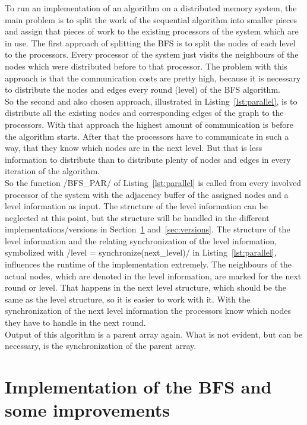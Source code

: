 \documentclass[12pt,a4paper]{article}
\begin{document}
To run an implementation of an algorithm on a distributed memory system, the main problem is to split the work of the sequential algorithm into smaller pieces and assign that pieces of work to the existing processors of the system which are in use.  The first approach of splitting the BFS is to split the nodes of each level to the processors. Every processor of the system just visits the neighbours of the nodes which were distributed before to that processor. The problem with this approach is that the communication costs are pretty high, because it is necessary to distribute the nodes and edges every round (level) of the BFS algorithm.\\
So the second and also chosen approach, illustrated in Listing~\ref{lst:parallel}, is to distribute all the existing nodes and corresponding edges of the graph to the processors. With that approach the highest amount of communication is before the algorithm starts. After that the processors have to communicate in such a way, that they know which nodes are in the next level. But that is less information to distribute than to distribute plenty of nodes and edges in every iteration of the algorithm.\\
So the function \cinline/BFS_PAR/ of Listing~\ref{lst:parallel} is called from every involved processor of the system with the adjacency buffer of the assigned nodes and a level information as input. The structure of the level information can be neglected at this point, but the structure will be handled in the different implementations/versions in Section~\ref{sec:implementations} and~\ref{sec:versions}. The structure of the level information and the relating synchronization of the level information, symbolized with \cinline/level = synchronize(next_level)/ in Listing~\ref{lst:parallel}, influences the runtime of the implementation extremely. The neighbours of the actual nodes, which are denoted in the level information, are marked for the next round or level. That happens in the next level structure, which should be the same as the level structure, so it is easier to work with it. With the synchronization of the next level information the processors know which nodes they have to handle in the next round.\\
Output of this algorithm is a parent array again. What is not evident, but can be necessary, is the synchronization of the parent array. 

\section{Implementation of the BFS and some improvements}
\label{sec:implementations}
\end{document}
